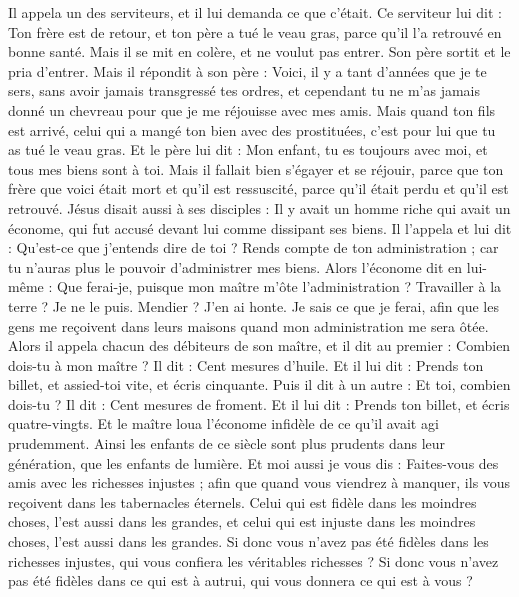 \begin{multicols}{2}
Il appela un des serviteurs, et il lui demanda ce que c'était.
Ce serviteur lui dit : Ton frère est de retour, et ton père a tué le veau gras, parce qu'il l'a retrouvé en bonne santé.
Mais il se mit en colère, et ne voulut pas entrer. Son père sortit et le pria d'entrer.
Mais il répondit à son père : Voici, il y a tant d'années que je te sers, sans avoir jamais transgressé tes ordres, et cependant tu ne m'as jamais donné un chevreau pour que je me réjouisse avec mes amis.
Mais quand ton fils est arrivé, celui qui a mangé ton bien avec des prostituées, c’est pour lui que tu as tué le veau gras.
Et le père lui dit : Mon enfant, tu es toujours avec moi, et tous mes biens sont à toi.
Mais il fallait bien s’égayer et se réjouir, parce que ton frère que voici était mort et qu’il est ressuscité, parce qu’il était perdu et qu’il est retrouvé.
\VerseOne{}Jésus disait aussi à ses disciples : Il y avait un homme riche qui avait un économe, qui fut accusé devant lui comme dissipant ses biens.
Il l’appela et lui dit : Qu’est-ce que j'entends dire de toi ? Rends compte de ton administration ; car tu n'auras plus le pouvoir d'administrer mes biens.
Alors l'économe dit en lui-même : Que ferai-je, puisque mon maître m'ôte l'administration ? Travailler à la terre ? Je ne le puis. Mendier ? J’en ai honte.
Je sais ce que je ferai, afin que les gens me reçoivent dans leurs maisons quand mon administration me sera ôtée.
Alors il appela chacun des débiteurs de son maître, et il dit au premier : Combien dois-tu à mon maître ?
Il dit : Cent mesures d'huile. Et il lui dit : Prends ton billet, et assied-toi vite, et écris cinquante.
Puis il dit à un autre : Et toi, combien dois-tu ? Il dit : Cent mesures de froment. Et il lui dit : Prends ton billet, et écris quatre-vingts.
Et le maître loua l'économe infidèle de ce qu'il avait agi prudemment. Ainsi les enfants de ce siècle sont plus prudents dans leur génération, que les enfants de lumière.
Et moi aussi je vous dis : Faites-vous des amis avec les richesses injustes ; afin que quand vous viendrez à manquer, ils vous reçoivent dans les tabernacles éternels.
Celui qui est fidèle dans les moindres choses, l’est aussi dans les grandes, et celui qui est injuste dans les moindres choses, l’est aussi dans les grandes.
Si donc vous n'avez pas été fidèles dans les richesses injustes, qui vous confiera les véritables richesses ?
Si donc vous n’avez pas été fidèles dans ce qui est à autrui, qui vous donnera ce qui est à vous ?

\end{multicols}
